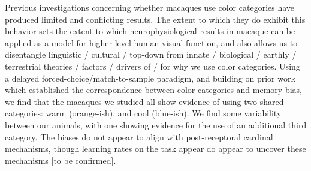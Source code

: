 Previous investigations concerning whether macaques use color categories have produced limited and conflicting results. 
The extent to which they do exhibit this behavior sets the extent to which neurophysiological results in macaque can be applied as a model for higher level human visual function, and also allows us to disentangle linguistic / cultural / top-down from innate / biological / earthly / terrestrial theories / factors / drivers of / for why we use color categories.
Using a delayed forced-choice/match-to-sample paradigm, and building on prior work which established the correspondence between color categories and memory bias, we find that the macaques we studied all show evidence of using two shared categories: warm (orange-ish), and cool (blue-ish). 
We find some variability between our animals, with one showing evidence for the use of an additional third category. 
The biases do not appear to align with post-receptoral cardinal mechanisms, though learning rates on the task appear do appear to uncover these mechanisms [to be confirmed].

